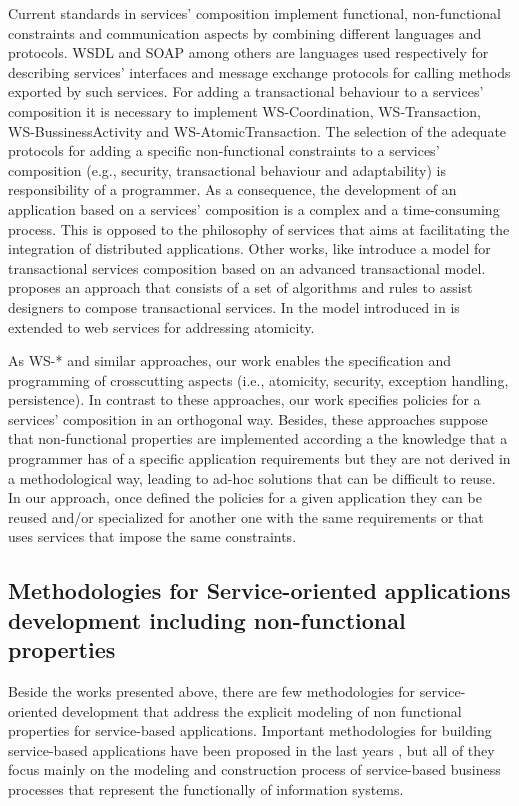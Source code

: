 Current standards in services' composition implement functional, non-functional constraints and communication aspects by combining different languages and protocols. WSDL and SOAP among others are languages used respectively for describing services' interfaces and message exchange protocols for calling methods exported by such services. For adding a transactional behaviour to a services' composition it is necessary to implement WS-Coordination, WS-Transaction, WS-BussinessActivity and WS-AtomicTransaction. The selection of the adequate protocols for adding a specific non-functional constraints to a services' composition (e.g., security, transactional behaviour and adaptability) is responsibility of a programmer. As a consequence, the development of an application based on a services' composition is a complex and a time-consuming process. This is opposed to the philosophy of services that aims at facilitating the integration of distributed applications. Other works, like \cite{Fauvet05} introduce a model for transactional services composition based on an advanced transactional model.\cite{BhiriGP05} proposes an approach that consists of a set of algorithms and rules to assist designers to compose transactional services. In \cite{Vidyasankar:2004} the model introduced in \cite{SchuldtABS02} is extended to web services for addressing atomicity.

As WS-* and similar approaches, our work enables the specification and programming of crosscutting aspects (i.e., atomicity, security, exception handling, persistence).
In contrast to these approaches, our work specifies policies for a services' composition in an orthogonal way. Besides, these approaches suppose that non-functional properties are implemented according a the knowledge that a programmer has of a specific application requirements but they are not derived in a methodological way, leading to ad-hoc solutions that can be difficult to reuse. In our approach, once defined the policies for a given application they can be reused and/or specialized for another one with the same requirements or that uses services that impose the same constraints.

\subsection{Methodologies for Service-oriented applications development including non-func\-tion\-al properties}

Beside the works presented above, there are few methodologies for service-oriented development that address the explicit modeling of non functional properties for service-based applications. Important methodologies for building service-based applications have been proposed in the last years \cite{Ramollari_asurvey,PapazoglouH06,FeuerlichtM05,soma,Arsanjani:2008}, but all of they focus mainly on the modeling and construction process of service-based business processes that represent the functionally of information systems.


